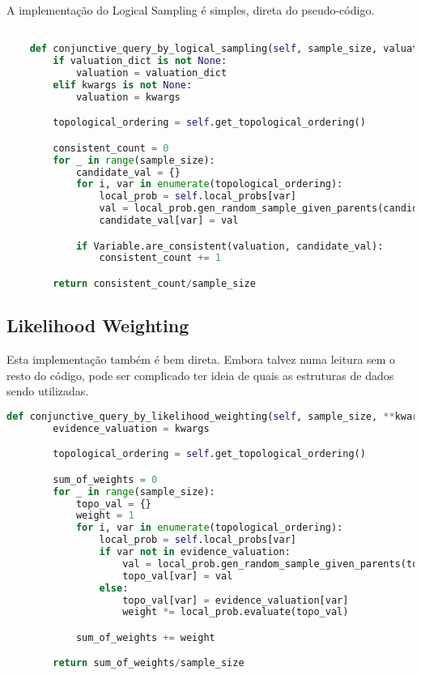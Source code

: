 \documentclass[paper=a4, fontsize=11pt]{scrartcl} %
\numberwithin{equation}{subsection}
\numberwithin{figure}{subsection}
\numberwithin{table}{subsection}
\numberwithin{definition}{subsection}
\numberwithin{theorem}{subsection}
\numberwithin{property}{subsection}
\numberwithin{proposition}{subsection}
\numberwithin{equation}{section}
\numberwithin{figure}{section}
\numberwithin{table}{section}
\numberwithin{definition}{section}
\numberwithin{theorem}{section}
\numberwithin{property}{section}
\numberwithin{proposition}{section}
\begin{document}
A implementação do Logical Sampling é simples, direta do pseudo-código.
\begin{lstlisting}[language=python]

    def conjunctive_query_by_logical_sampling(self, sample_size, valuation_dict=None, **kwargs):
        if valuation_dict is not None:
            valuation = valuation_dict
        elif kwargs is not None:
            valuation = kwargs

        topological_ordering = self.get_topological_ordering()

        consistent_count = 0
        for _ in range(sample_size):
            candidate_val = {}
            for i, var in enumerate(topological_ordering):
                local_prob = self.local_probs[var]
                val = local_prob.gen_random_sample_given_parents(candidate_val)
                candidate_val[var] = val

            if Variable.are_consistent(valuation, candidate_val):
                consistent_count += 1

        return consistent_count/sample_size

\end{lstlisting}

\subsection{Likelihood Weighting}
Esta implementação também é bem direta. Embora talvez numa leitura sem o resto do código, pode ser complicado
ter ideia de quais as estruturas de dados sendo utilizadas. 
\begin{lstlisting}[language=python]
    def conjunctive_query_by_likelihood_weighting(self, sample_size, **kwargs):
        evidence_valuation = kwargs

        topological_ordering = self.get_topological_ordering()

        sum_of_weights = 0
        for _ in range(sample_size):
            topo_val = {}
            weight = 1
            for i, var in enumerate(topological_ordering):
                local_prob = self.local_probs[var]
                if var not in evidence_valuation:
                    val = local_prob.gen_random_sample_given_parents(topo_val)
                    topo_val[var] = val
                else:
                    topo_val[var] = evidence_valuation[var]
                    weight *= local_prob.evaluate(topo_val)

            sum_of_weights += weight

        return sum_of_weights/sample_size
\end{lstlisting}
\end{document}
